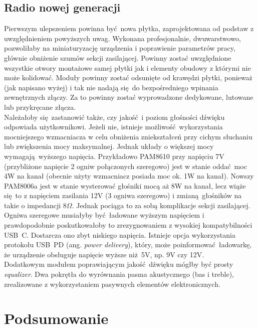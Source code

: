 \documentclass[polish]{aghengthesis}
\begin{document}
		\subsection{Radio nowej generacji}
			Pierwszym ulepszeniem powinna być nowa płytka, zaprojektowana od podstaw z uwzględnieniem powyższych uwag. Wykonana profesjonalnie, dwuwarstwowo, pozwoliłaby na miniaturyzację urządzenia i poprawienie parametrów pracy, głównie obniżenie szumów sekcji zasilającej. Powinny zostać uwzględnione wszystkie otwory montażowe samej płytki jak i elementy obudowy z którymi nie może kolidować. Moduły powinny zostać odsunięte od krawędzi płytki, ponieważ (jak napisano wyżej) i tak nie nadają się do bezpośredniego wpinania zewnętrznych złączy. Za to powinny zostać wyprowadzone dedykowane, lutowane lub przykręcane złącza.
			$ $\\

			Należałoby się zastanowić także, czy jakość i poziom głośności dźwięku odpowiada użytkownikowi. Jeżeli nie, istnieje możliwość wykorzystania mocniejszego wzmacniacza w celu obniżenia zniekształceń przy cichym słuchaniu lub zwiększenia mocy maksymalnej. Jednak układy o większej mocy wymagają wyższego napięcia.
			Przykładowo PAM8610\textsuperscript{\cite{ch5_pam8610}} przy napięciu 7V (przybliżone napięcie 2 ogniw połączonych szeregowo) jest w stanie oddać moc 4W na kanał (obecnie użyty wzmacniacz posiada moc ok. 1W na kanał). Nowszy PAM8006a\textsuperscript{\cite{ch5_pam8006a}} jest w stanie wysterować głośniki mocą aż 8W na kanał, lecz wiąże się to z napięciem zasilania 12V (3 ogniwa szeregowo) i zmianą głośników na takie o impedancji $8 \Omega$.
			Jednak pociąga to za sobą komplikacje sekcji zasilającej. Ogniwa szeregowe musiałyby być ładowane wyższym napięciem i prawdopodobnie poskutkowałoby to zrezygnowaniem z wysokiej kompatybilności USB~C. Dostarcza ono zbyt niskiego napięcia. Istnieje opcja wykorzystania protokołu USB~PD (ang. \textit{power delivery}), który, może poinformować ładowarkę, że urządzenie obsługuje napięcie wyższe niż 5V, np. 9V czy 12V.
			$ $\\
			
			Dodatkowym modułem poprawiającym jakość dźwięku mógłby być prosty \textit{equalizer}. Dwa pokrętła do wyrównania pasma akustycznego (bas i treble), zrealizowane z wykorzystaniem pasywnych elementów elektronicznych.
			
	\section{Podsumowanie}
	
\end{document}
